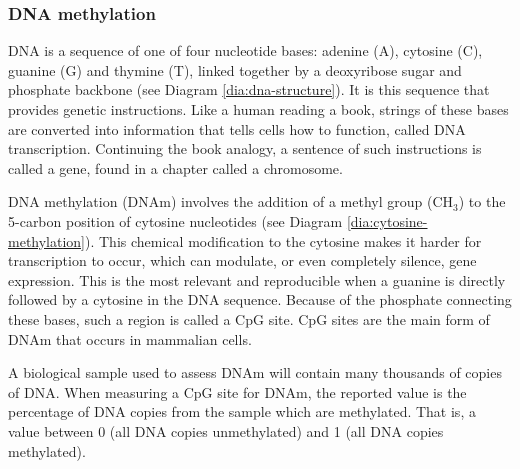 \documentclass{article} %
\begin{document}
\subsubsection{DNA methylation}
DNA is a sequence of one of four nucleotide bases: adenine (A), cytosine (C), guanine (G) and thymine (T), linked together by a deoxyribose sugar and phosphate backbone (see Diagram \ref{dia:dna-structure}). It is this sequence that provides genetic instructions. Like a human reading a book, strings of these bases are converted into information that tells cells how to function, called DNA transcription. Continuing the book analogy, a sentence of such instructions is called a gene, found in a chapter called a chromosome.

DNA methylation (DNAm) involves the addition of a methyl group (CH\(_3\)) to the 5-carbon position of cytosine nucleotides (see Diagram \ref{dia:cytosine-methylation}). This chemical modification to the cytosine makes it harder for transcription to occur, which can modulate, or even completely silence, gene expression. This is the most relevant and reproducible when a guanine is directly followed by a cytosine in the DNA sequence. Because of the phosphate connecting these bases, such a region is called a CpG site. CpG sites are the main form of DNAm that occurs in mammalian cells.

A biological sample used to assess DNAm will contain many thousands of copies of DNA. When measuring a CpG site for DNAm, the reported value is the percentage of DNA copies from the sample which are methylated. That is, a value between 0 (all DNA copies unmethylated) and 1 (all DNA copies methylated).

\end{document}
